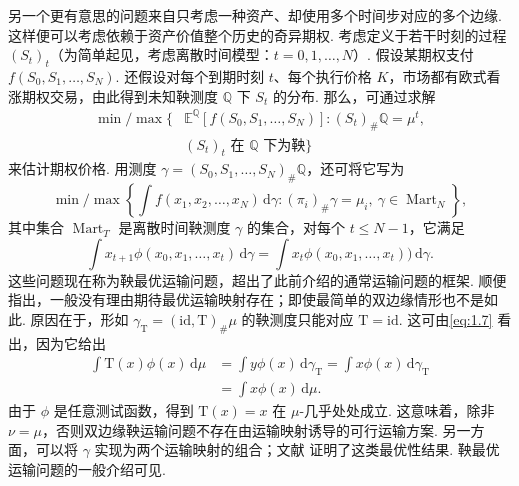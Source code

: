另一个更有意思的问题来自只考虑一种资产、却使用多个时间步对应的多个边缘. 这样便可以考虑依赖于资产价值整个历史的奇异期权. 考虑定义于若干时刻的过程 $(S_t)_t$（为简单起见，考虑离散时间模型：$t=0,1,\ldots,N$）. 假设某期权支付 $f(S_0,S_1,\ldots,S_N)$. 还假设对每个到期时刻 $t$、每个执行价格 $K$，市场都有欧式看涨期权交易，由此得到未知鞅测度 $\mathbb Q$ 下 $S_t$ 的分布. 那么，可通过求解
\begin{equation*}
\begin{aligned}
 \min/\max\bigl\{&\mathbb E^{\mathbb Q}[f(S_0,S_1,\ldots,S_N)]:
      (S_t)_\#\mathbb Q=\mu^t,\\
      &(S_t)_t\text{ 在 }\mathbb Q\text{ 下为鞅}\bigr\}
\end{aligned}
\end{equation*}
来估计期权价格. 用测度 $\gamma=(S_0,S_1,\ldots,S_N)_\#\mathbb Q$，还可将它写为
\[
 \min/\max\left\{\int f(x_1,x_2,\ldots,x_N)\,\mathrm d\gamma:
       (\pi_i)_\#\gamma=\mu_i,\ \gamma\in\operatorname{Mart}_N\right\},
\]
其中集合 $\operatorname{Mart}_T$ 是离散时间鞅测度 $\gamma$ 的集合，对每个 $t\leq N-1$，它满足
\begin{equation}\label{eq:1.7}
 \int x_{t+1}\phi(x_0,x_1,\ldots,x_t)\,\mathrm d\gamma
 =\int x_t\phi(x_0,x_1,\ldots,x_t))\,\mathrm d\gamma.
\end{equation}
这些问题现在称为鞅最优运输问题，超出了此前介绍的通常运输问题的框架. 顺便指出，一般没有理由期待最优运输映射存在；即使最简单的双边缘情形也不是如此. 原因在于，形如 $\gamma_{\mathrm{T}}=(\mathrm{id},\mathrm{T})_\#\mu$ 的鞅测度只能对应 $\mathrm{T}=\mathrm{id}$. 这可由\eqref{eq:1.7} 看出，因为它给出
\begin{equation*}
\begin{aligned}
 \int \mathrm{T}(x)\phi(x)\,\mathrm d\mu
 &=\int y\phi(x)\,\mathrm d\gamma_{\mathrm{T}}
  =\int x\phi(x)\,\mathrm d\gamma_{\mathrm{T}}\\
 &=\int x\phi(x)\,\mathrm d\mu.
\end{aligned}
\end{equation*}
由于 $\phi$ 是任意测试函数，得到 $\mathrm{T}(x)=x$ 在 $\mu$-几乎处处成立. 这意味着，除非 $\nu=\mu$，否则双边缘鞅运输问题不存在由运输映射诱导的可行运输方案. 另一方面，可以将 $\gamma$ 实现为两个运输映射的组合；文献\cite{b31,b193} 证明了这类最优性结果. 鞅最优运输问题的一般介绍可见\cite{b32,b173}.

